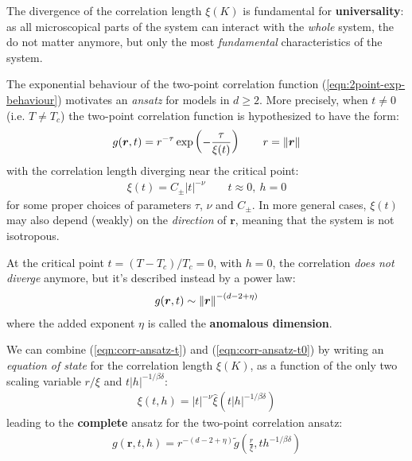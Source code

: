 \documentclass[../../main.tex]{subfiles}
\begin{document}
The divergence of the correlation length $\xi(K)$ is fundamental for \textbf{universality}: as all microscopical parts of the system can interact with the \textit{whole} system, the  do not matter anymore, but only the most \textit{fundamental} characteristics of the system.

\medskip

The exponential behaviour of the two-point correlation function (\ref{eqn:2point-exp-behaviour}) motivates an \textit{ansatz} for models in $d \geq 2$. More precisely, when $t \neq 0$ (i.e. $T \neq T_c$) the two-point correlation function is hypothesized to have the form:
\begin{align}\label{eqn:corr-ansatz-t}
    g(\bm{r}, t) = r^{-\tau} \exp\left(-\frac{\tau}{\xi(t)} \right) \qquad r=\norm{\bm{r}}
\end{align} 
with the correlation length diverging near the critical point:
\begin{align}\label{eqn:corr-length-t}
    \xi(t) = C_\pm |t|^{-\nu} \qquad t \approx 0, \> h = 0
\end{align}
for some proper choices of parameters $\tau$, $\nu$ and $C_\pm$. In more general cases, $\xi(t)$ may also depend (weakly) on the \textit{direction} of $\bm{r}$, meaning that the system is not isotropous.

\medskip

At the critical point $t = (T-T_c)/T_c = 0$, with $h=0$, the correlation \textit{does not diverge} anymore, but it's described instead by a power law: 
\begin{align}
    g(\bm{r}, t) \sim \norm{\bm{r}}^{-(d-2 + \eta)}\label{eqn:corr-ansatz-t0}
\end{align}
where the added exponent $\eta$ is called the \textbf{anomalous dimension}. 

\medskip

We can combine (\ref{eqn:corr-ansatz-t}) and (\ref{eqn:corr-ansatz-t0}) by writing an \textit{equation of state} for the correlation length $\xi(K)$, as a function of the only two  scaling variable $r/\xi$ and $t |h|^{-1/\beta \delta}$:
\begin{align}\label{eqn:corr-length-ansatz}
    \xi(t, h) = |t|^{-\nu} \hat{\xi} (t |h|^{-1/\beta \delta})
\end{align}
leading to the \textbf{complete} ansatz for the two-point correlation ansatz:
\begin{align}\label{eqn:correlation-ansatz-full}
    g(\bm{r}, t, h) = r^{-(d-2+\eta)} \tilde{g} \left(\frac{r}{\xi}, t h^{-1/\beta \delta} \right)
\end{align} 
\end{document}
